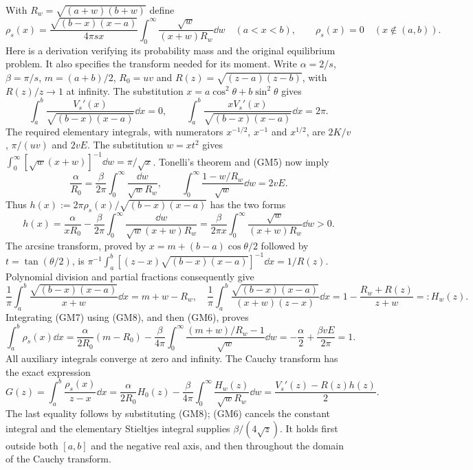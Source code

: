 \documentclass[11pt]{article}
\begin{document}
With $R_w=\sqrt{(a+w)(b+w)}$ define
\begin{equation}\tag{GM4}
 \rho_s(x)=\frac{\sqrt{(b-x)(x-a)}}{4\pi s x}
       \int_0^\infty\frac{\sqrt w}{(x+w)R_w}\dd w\quad(a<x<b),
 \qquad \rho_s(x)=0\quad(x\notin(a,b)).
\end{equation}
Here is a derivation verifying its probability mass and the original
equilibrium problem. It also specifies the transform needed for its moment.
Write $\alpha=2/s$, $\beta=\pi/s$, $m=(a+b)/2$, $R_0=uv$ and
$R(z)=\sqrt{(z-a)(z-b)}$, with $R(z)/z\to1$ at infinity.
The substitution $x=a\cos^2\theta+b\sin^2\theta$ gives
\begin{equation}\tag{GM5}
 \int_a^b\frac{V_s'(x)}{\sqrt{(b-x)(x-a)}}\dd x=0,
 \qquad
 \int_a^b\frac{xV_s'(x)}{\sqrt{(b-x)(x-a)}}\dd x=2\pi.
\end{equation}
The required elementary integrals, with numerators $x^{-1/2}$,
$x^{-1}$ and $x^{1/2}$, are $2K/v$, $\pi/(uv)$ and $2vE$.
The substitution $w=xt^2$ gives
$\int_0^\infty[\sqrt w(x+w)]^{-1}\dd w=\pi/\sqrt x$.
Tonelli's theorem and (GM5) now imply
\begin{equation}\tag{GM6}
 \frac\alpha{R_0}=\frac\beta{2\pi}
       \int_0^\infty\frac{\dd w}{\sqrt wR_w},\qquad
 \int_0^\infty\frac{1-w/R_w}{\sqrt w}\dd w=2vE.
\end{equation}
Thus $h(x):=2\pi\rho_s(x)/\sqrt{(b-x)(x-a)}$ has the two forms
\begin{equation}\tag{GM7}
 h(x)=\frac\alpha{xR_0}-\frac\beta{2\pi}
       \int_0^\infty\frac{\dd w}{\sqrt w(x+w)R_w}
 =\frac\beta{2\pi x}\int_0^\infty\frac{\sqrt w}{(x+w)R_w}\dd w>0.
\end{equation}
The arcsine transform, proved by $x=m+(b-a)\cos\theta/2$ followed
by $t=\tan(\theta/2)$, is
$\pi^{-1}\int_a^b[(z-x)\sqrt{(b-x)(x-a)}]^{-1}\dd x=1/R(z)$.
Polynomial division and partial fractions consequently give
\begin{equation}\tag{GM8}
 \frac1\pi\int_a^b\frac{\sqrt{(b-x)(x-a)}}{x+w}\dd x=m+w-R_w,
 \quad
 \frac1\pi\int_a^b\frac{\sqrt{(b-x)(x-a)}}{(x+w)(z-x)}\dd x
 =1-\frac{R_w+R(z)}{z+w}=:H_w(z).
\end{equation}
Integrating (GM7) using (GM8), and then (GM6), proves
\begin{equation}\tag{GM9}
 \int_a^b\rho_s(x)\dd x
 =\frac\alpha{2R_0}(m-R_0)-\frac\beta{4\pi}
  \int_0^\infty\frac{(m+w)/R_w-1}{\sqrt w}\dd w
 =-\frac\alpha2+\frac{\beta vE}{2\pi}=1.
\end{equation}
All auxiliary integrals converge at zero and infinity. The Cauchy transform
has the exact expression
\begin{equation}\tag{GM10}
 G(z)=\int_a^b\frac{\rho_s(x)}{z-x}\dd x
 =\frac\alpha{2R_0}H_0(z)-\frac\beta{4\pi}
       \int_0^\infty\frac{H_w(z)}{\sqrt wR_w}\dd w
 =\frac{V_s'(z)-R(z)h(z)}2.
\end{equation}
The last equality follows by substituting (GM8); (GM6) cancels the
constant integral and the elementary Stieltjes integral supplies
$\beta/(4\sqrt z)$. It holds first outside both $[a,b]$ and the
negative real axis, and then throughout the domain of the Cauchy transform.
\end{document}
